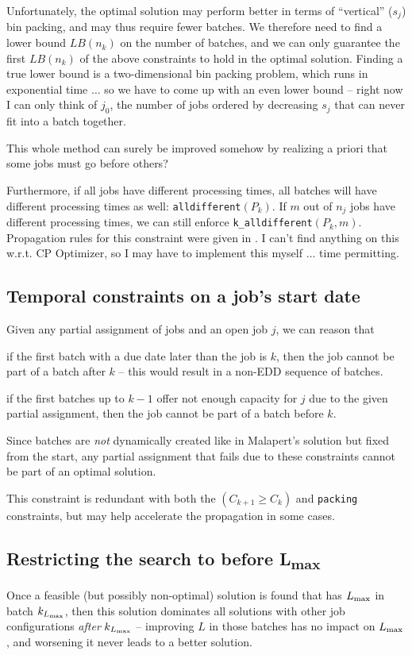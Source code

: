 \documentclass[13pt, letterpaper, twoside]{book}
\begin{document}
Unfortunately, the optimal solution may perform better in terms of ``vertical''
($s_j$) bin packing, and may thus
require fewer batches. We therefore need to find a lower bound $LB(n_k)$ on the
number of batches, and we can only guarantee the first $LB(n_k)$ of the above
constraints to hold in the optimal solution. Finding a true lower bound is a
two-dimensional bin packing problem, which runs in exponential time
{\color{darkred} $\dots$ so we have to come up with an even lower bound -- right
now I can only think of $j_0$, the number of jobs ordered by decreasing $s_j$
that can never fit into a batch together.}

{\color{darkred} This whole method can surely be
improved somehow by realizing a priori that some jobs must go before others?}

Furthermore, if all jobs have different processing times, all batches will have
different processing times as well: \texttt{alldifferent}$(P_k)$. If $m$ out of $n_j$ jobs have different
processing times, we can still enforce \texttt{k\_alldifferent}$(P_k, m)$.
Propagation rules for this constraint were given in \cite{Lardeux}.
{\color{darkred} I can't find anything on this w.r.t. CP Optimizer, so I may
have to implement this myself $\dots$ time permitting.} 

\subsection{Temporal constraints on a job's start date}
Given any partial assignment of jobs and an open job $j$, we can reason that
\begin{alist}
\item{if the first batch with a due date later than the job is $k$, then the job
cannot be part of a batch after $k$ -- this would result in a non-EDD sequence
of batches.}
\item{if the first batches up to $k-1$ offer not enough capacity for $j$ due to
the given partial assignment, then the job cannot be part of a batch before
$k$.}
\end{alist}
Since batches are \textit{not} dynamically created like in Malapert's solution
but fixed from the start, any partial assignment that fails due to these
constraints cannot be part of an optimal solution.

This constraint is redundant with both the $(C_{k+1}\geq C_k)$ and
\texttt{packing} constraints, but may help accelerate the propagation in some
cases.

\subsection{Restricting the search to {\sansitalicfont before
L}\textsubscript{max}}
Once a feasible (but possibly non-optimal) solution is found that has $L_{\text{max}}$ in
batch $k_{L_{\text{max}}}$, then this solution dominates all solutions with other job
configurations 
\textit{after} $k_{L_{\text{max}}}$ -- improving $L$ in those batches has no impact on $L_{\text{max}}$,
and worsening it never leads to a better solution.
\end{document}
